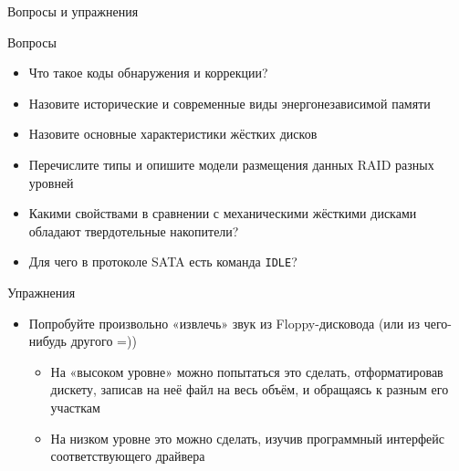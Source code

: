 \documentclass[xetex,aspectratio=43]{beamer}
\begin{document}
\begin{frame}{Вопросы и упражнения}
\begin{block}{Вопросы}
\begin{itemize}
\tightlist
\item
  Что такое коды обнаружения и коррекции?
\item
  Назовите исторические и современные виды энергонезависимой памяти
\item
  Назовите основные характеристики жёстких дисков
\item
  Перечислите типы и опишите модели размещения данных RAID разных
  уровней
\item
  Какими свойствами в сравнении с механическими жёсткими дисками
  обладают твердотельные накопители?
\item
  Для чего в протоколе SATA есть команда \texttt{IDLE}?
\end{itemize}
\end{block}

\begin{block}{Упражнения}
\begin{itemize}
\tightlist
\item
  Попробуйте произвольно «извлечь» звук из Floppy-дисковода (или из чего-нибудь другого =))

  \begin{itemize}
  \tightlist
  \item
    На «высоком уровне» можно попытаться это сделать, отформатировав
    дискету, записав на неё файл на весь объём, и обращаясь к разным его
    участкам
  \item
    На низком уровне это можно сделать, изучив программный интерфейс
    соответствующего драйвера
  \end{itemize}
\end{itemize}
\end{block}
\end{frame}

\postamble
\end{document}
